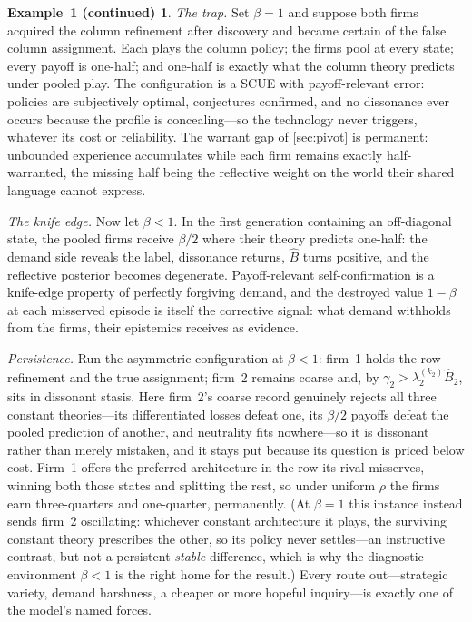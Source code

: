 \documentclass[11pt]{article}
\theoremstyle{definition}
\newtheorem*{excont}{Example~1 (continued)}
\begin{document}
\begin{excont}
\emph{The trap.}  Set $\beta=1$ and suppose both firms acquired the column
refinement after discovery and became certain of the false column assignment.
Each plays the column policy; the firms pool at every state; every payoff is
one-half; and one-half is exactly what the column theory predicts under pooled
play.  The configuration is a SCUE with payoff-relevant error: policies are
subjectively optimal, conjectures confirmed, and no dissonance ever occurs
because the profile is concealing---so the technology never triggers, whatever
its cost or reliability.  The warrant gap of \cref{sec:pivot} is permanent:
unbounded experience accumulates while each firm remains exactly
half-warranted, the missing half being the reflective weight on the world
their shared language cannot express.

\emph{The knife edge.}  Now let $\beta<1$.  In the first generation containing
an off-diagonal state, the pooled firms receive $\beta/2$ where their theory
predicts one-half: the demand side reveals the label, dissonance returns,
$\widehat B$ turns positive, and the reflective posterior becomes degenerate.
Payoff-relevant self-confirmation is a knife-edge property of perfectly
forgiving demand, and the destroyed value $1-\beta$ at each misserved episode
is itself the corrective signal: what demand withholds from the firms, their
epistemics receives as evidence.

\emph{Persistence.}  Run the asymmetric configuration at $\beta<1$: firm~1
holds the row refinement and the true assignment; firm~2 remains coarse and,
by $\gamma_2>\lambda_2^{(k_2)}\widehat B_2$, sits in dissonant stasis.  Here
firm~2's coarse record genuinely rejects all three constant theories---its
differentiated losses defeat one, its $\beta/2$ payoffs defeat the pooled
prediction of another, and neutrality fits nowhere---so it is dissonant rather
than merely mistaken, and it stays put because its question is priced below
cost.  Firm~1 offers the preferred architecture in the row its rival
misserves, winning both those states and splitting the rest, so under uniform
$\rho$ the firms earn three-quarters and one-quarter, permanently.  (At
$\beta=1$ this instance instead sends firm~2 oscillating: whichever constant
architecture it plays, the surviving constant theory prescribes the other, so
its policy never settles---an instructive contrast, but not a persistent
\emph{stable} difference, which is why the diagnostic environment $\beta<1$ is
the right home for the result.)  Every route out---strategic variety, demand
harshness, a cheaper or more hopeful inquiry---is exactly one of the model's
named forces.
\end{excont}
\end{document}
